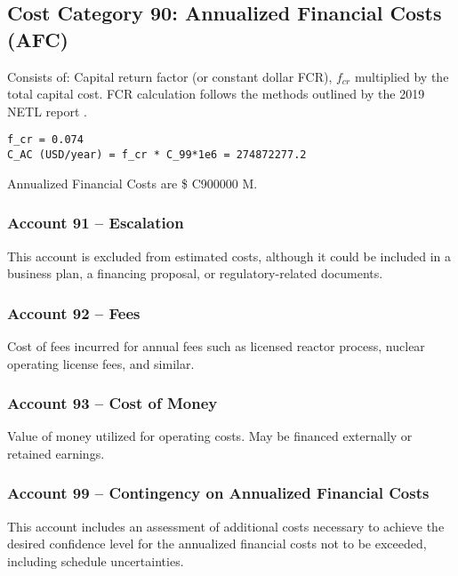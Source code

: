 \subsection{Cost Category 90: Annualized Financial Costs (AFC)}

Consists of: Capital return factor (or constant dollar FCR), $f_{cr}$ multiplied by the total capital cost. FCR calculation follows the methods outlined by the 2019 NETL report \cite{NETL2019a}.

\begin{verbatim} 
f_cr = 0.074 
C_AC (USD/year) = f_cr * C_99*1e6 = 274872277.2
\end{verbatim} 

Annualized Financial Costs are \$ C900000 M.

\subsubsection*{Account 91 – Escalation}
This account is excluded from estimated costs, although it could be included in a business plan, a financing proposal, or regulatory-related documents.

\subsubsection*{Account 92 – Fees}
Cost of fees incurred for annual fees such as licensed reactor process, nuclear operating license fees, and similar.

\subsubsection*{Account 93 – Cost of Money}
Value of money utilized for operating costs. May be financed externally or retained earnings.

\subsubsection*{Account 99 – Contingency on Annualized Financial Costs}
This account includes an assessment of additional costs necessary to achieve the desired confidence level for the annualized financial costs not to be exceeded, including schedule uncertainties.\\
